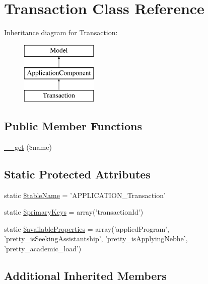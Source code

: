 \hypertarget{class_transaction}{\section{Transaction Class Reference}
\label{class_transaction}
}
Inheritance diagram for Transaction\-:\begin{figure}[H]
\begin{center}
\leavevmode
\includegraphics[height=3.000000cm]{class_transaction}
\end{center}
\end{figure}
\subsection*{Public Member Functions}
\begin{DoxyCompactItemize}
\item 
\hyperlink{class_transaction_afad271614232f3fffc0cc0d841c820f4}{\-\_\-\-\_\-get} (\$name)
\end{DoxyCompactItemize}
\subsection*{Static Protected Attributes}
\begin{DoxyCompactItemize}
\item 
static \hyperlink{class_transaction_a1e7fee8d4d26108b4e1a33478af9135b}{\$table\-Name} = 'A\-P\-P\-L\-I\-C\-A\-T\-I\-O\-N\-\_\-\-Transaction'
\item 
static \hyperlink{class_transaction_a9ab0151d5dd1ef33b5486c2340d0af16}{\$primary\-Keys} = array('transaction\-Id')
\item 
static \hyperlink{class_transaction_a71d322ec3be0e210bfe2922c2e498ee8}{\$available\-Properties} = array('applied\-Program', 'pretty\-\_\-is\-Seeking\-Assistantship', 'pretty\-\_\-is\-Applying\-Nebhe', 'pretty\-\_\-academic\-\_\-load')
\end{DoxyCompactItemize}
\subsection*{Additional Inherited Members}


